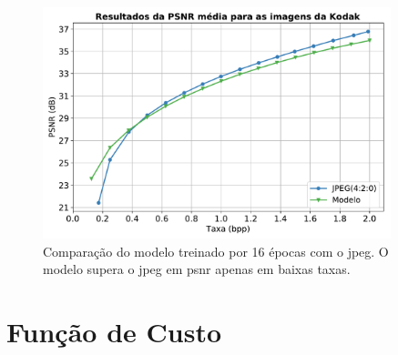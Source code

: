 \begin{figure}
	\centering
	\includegraphics[width=0.9\textwidth]{figuras/psnr_ae_jpeg.pdf}
	\caption[Curva \acrshort{psnr} por Taxa]{Comparação do modelo treinado por 16 épocas com o \acrshort{jpeg}. O modelo supera o \acrshort{jpeg} em \acrshort{psnr} apenas em baixas taxas.}
	\label{fig:psnr_ae_jpeg}
\end{figure}	









\section{Função de Custo}


